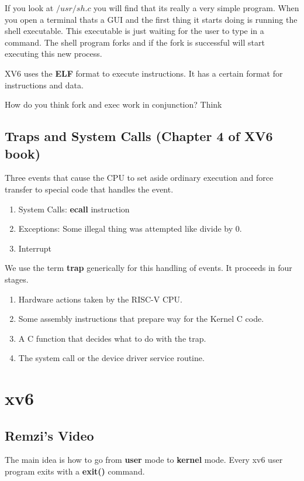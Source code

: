 \documentclass[11pt]{article}
\begin{document}
If you look at $/usr/sh.c$ you will find that its really a very simple program. When you open a terminal thats a GUI and the first thing it starts doing is running the shell executable. This executable is just waiting for the user to type in a command. The shell program forks and if the fork is successful will start executing this new process. 

XV6 uses the \textbf{ELF} format to execute instructions. It has a certain format for instructions and data. 

How do you think fork and exec work in conjunction? Think

\subsection{Traps and System Calls (Chapter 4 of XV6 book)}

Three events that cause the CPU to set aside ordinary execution and force transfer to special code that handles the event.
\begin{enumerate}
	\item System Calls: \textbf{ecall} instruction
	\item Exceptions: Some illegal thing was attempted like divide by 0.
	\item Interrupt
\end{enumerate}

We use the term \textbf{trap} generically for this handling of events.
It proceeds in four stages.
\begin{enumerate}
	\item Hardware actions taken by the RISC-V CPU.
	\item Some assembly instructions that prepare way for the Kernel C code.
	\item A C function that decides what to do with the trap.
	\item The system call or the device driver service routine.
\end{enumerate}


\section{xv6}

\subsection{Remzi's Video \cite{xv6_remzi}}
The main idea is how to go from \textbf{user} mode to \textbf{kernel} mode. Every xv6 user program exits with a \textbf{exit()} command. 
\end{document}
